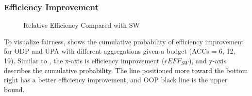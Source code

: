 \subsubsection{Efficiency Improvement}
\label{subsubsec:agg-sw}

\begin{figure}[]
\vspace{-10pt}
	\centering
		\hfill
        \hfill
\vspace{-8pt}
	\caption{Relative Efficiency Compared with SW}
	\label{fig:OpenVXsw}
\end{figure}

To visualize fairness,  shows the cumulative probability of efficiency improvement for ODP and UPA with different aggregations given a budget (ACCs = 6, 12, 19).
Similar to , the x-axis is efficiency improvement ($rEFF_{SW}$), and y-axis describes the cumulative probability. The line positioned more toward the bottom right has a better efficiency improvement, and OOP black line is the upper bound. 


